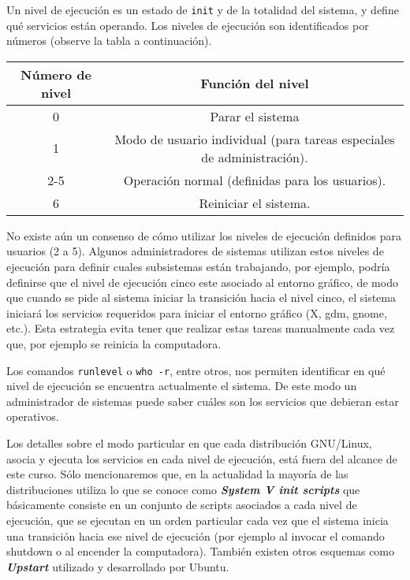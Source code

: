 \documentclass[12pt]{article}
\begin{document}
Un nivel de ejecución es un estado de \texttt{init} y de la totalidad del 
sistema, y define qué servicios están operando. Los niveles de ejecución 
son identificados por números (observe la tabla a continuación). 

\begin{center}
\begin{tabular}{|c|c|}\hline
\rowcolor{tcA}
\textbf{Número de nivel} & \textbf{Función del nivel}\\\hline
0 & Parar el sistema\\\hline
1 & Modo de usuario individual (para tareas especiales de administración).\\\hline
2-5 & Operación normal (definidas para los usuarios).\\\hline
6 & Reiniciar el sistema.\\\hline
\end{tabular}
\end{center}

No existe aún un consenso de cómo utilizar los niveles de ejecución definidos 
para usuarios (2 a 5). Algunos administradores  
de sistemas utilizan estos niveles de ejecución para definir cuales subsistemas están trabajando, 
por ejemplo, podría definirse que el nivel de ejecución cinco este asociado al entorno gráfico, 
de modo que cuando se pide al sistema iniciar la transición hacia el nivel cinco, el sistema 
iniciará los servicios requeridos para iniciar el entorno gráfico (X, gdm, gnome, etc.). Esta 
estrategia evita tener que realizar estas tareas manualmente cada vez que, por ejemplo 
se reinicia la computadora.  

Los comandos \texttt{runlevel} o \texttt{who -r}, entre otros, nos permiten 
identificar en qué nivel de ejecución se encuentra actualmente el sistema. 
De este modo un administrador de sistemas puede saber cuáles son los servicios
que debieran estar operativos. 

Los detalles sobre el modo particular en que cada distribución GNU/Linux, 
asocia y ejecuta los servicios en cada nivel de ejecución, está fuera 
del alcance de este curso. Sólo mencionaremos que, en la actualidad 
la mayoría de las distribuciones utiliza lo que se conoce como
\textit{\textbf{System V init scripts}} que básicamente consiste en 
un conjunto de scripts asociados a cada nivel de ejecución, que se ejecutan 
en un orden particular cada vez que el sistema inicia una transición 
hacia ese nivel de ejecución (por ejemplo al invocar el comando shutdown 
o al encender la computadora). También existen otros esquemas como 
\textit{\textbf{Upstart}} utilizado y desarrollado por Ubuntu. 
\end{document}
